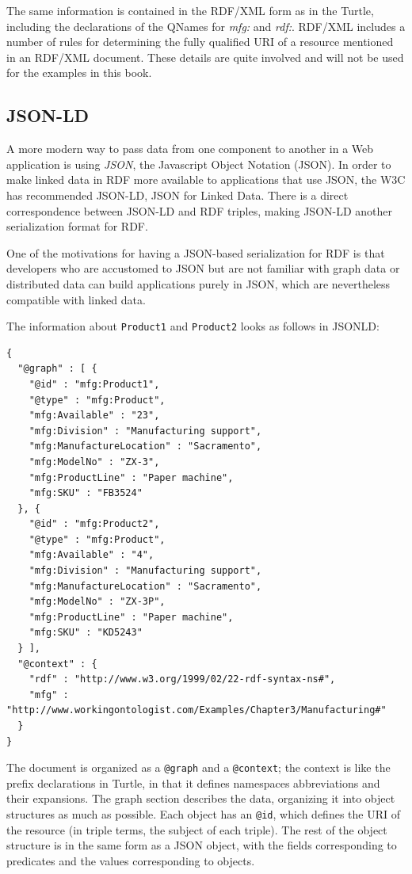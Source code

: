The same information is contained in the RDF/XML form as in the Turtle,
including the declarations of the QNames for \emph{mfg:} and \emph{rdf:}. RDF/XML
includes a number of rules for determining the fully qualified URI of a
resource mentioned in an RDF/XML document. These details are quite
involved and will not be used for the examples in this book.

\subsection{JSON-LD}

A more modern way to pass data from one component to another in a Web
application is using \emph{JSON}, the Javascript Object Notation (JSON). In
order to make linked data in RDF more available to applications that use
JSON, the W3C has recommended JSON-LD, JSON for Linked Data. There is a
direct correspondence between JSON-LD and RDF triples, making JSON-LD
another serialization format for RDF.

One of the motivations for having a JSON-based serialization for RDF is
that developers who are accustomed to JSON but are not familiar with
graph data or distributed data can build applications purely in JSON,
which are nevertheless compatible with linked data.

The information about \texttt{Product1} and \texttt{Product2} looks as follows in JSONLD:

\begin{lstlisting}
{
  "@graph" : [ {
    "@id" : "mfg:Product1",
    "@type" : "mfg:Product",
    "mfg:Available" : "23",
    "mfg:Division" : "Manufacturing support",
    "mfg:ManufactureLocation" : "Sacramento",
    "mfg:ModelNo" : "ZX-3",
    "mfg:ProductLine" : "Paper machine",
    "mfg:SKU" : "FB3524"
  }, {
    "@id" : "mfg:Product2",
    "@type" : "mfg:Product",
    "mfg:Available" : "4",
    "mfg:Division" : "Manufacturing support",
    "mfg:ManufactureLocation" : "Sacramento",
    "mfg:ModelNo" : "ZX-3P",
    "mfg:ProductLine" : "Paper machine",
    "mfg:SKU" : "KD5243"
  } ],
  "@context" : {
    "rdf" : "http://www.w3.org/1999/02/22-rdf-syntax-ns#",
    "mfg" : "http://www.workingontologist.com/Examples/Chapter3/Manufacturing#"
  }
}
\end{lstlisting}


The document is organized as a \texttt{@graph} and a \texttt{@context}; the context
is like the prefix declarations in Turtle, in that it defines namespaces
abbreviations and their expansions. The graph section describes the
data, organizing it into object structures as much as possible. Each
object has an \texttt{@id}, which defines the URI of the resource (in triple
terms, the subject of each triple). The rest of the object structure is
in the same form as a JSON object, with the fields corresponding to
predicates and the values corresponding to objects.


